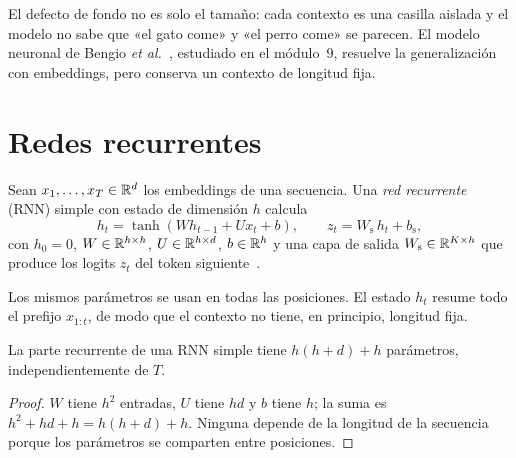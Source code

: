 El defecto de fondo no es solo el tamaño: cada contexto es una casilla aislada y el modelo no sabe que «el gato come» y «el perro come» se parecen. El modelo neuronal de Bengio \emph{et al.}~\cite{bengio03}, estudiado en el módulo~9, resuelve la generalización con embeddings, pero conserva un contexto de longitud fija.

\section{Redes recurrentes}

\begin{definicion}\label{def:rnn}
Sean $x_1,\dots,x_T\in\mathbb{R}^{d}$ los embeddings de una secuencia. Una \emph{red recurrente} (RNN) simple con estado de dimensión $h$ calcula
\[
h_t=\tanh(W h_{t-1}+U x_t+b),\qquad z_t=W_{\mathrm{s}}\,h_t+b_{\mathrm{s}},
\]
con $h_0=0$, $W\in\mathbb{R}^{h\times h}$, $U\in\mathbb{R}^{h\times d}$, $b\in\mathbb{R}^{h}$ y una capa de salida $W_{\mathrm{s}}\in\mathbb{R}^{K\times h}$ que produce los logits $z_t$ del token siguiente~\cite[§14.1--14.2]{jm3}.
\end{definicion}

Los mismos parámetros se usan en todas las posiciones. El estado $h_t$ resume todo el prefijo $x_{1:t}$, de modo que el contexto no tiene, en principio, longitud fija.

\begin{proposicion}\label{prop:param-rnn}
La parte recurrente de una RNN simple tiene $h(h+d)+h$ parámetros, independientemente de $T$.
\end{proposicion}

\begin{proof}
$W$ tiene $h^{2}$ entradas, $U$ tiene $hd$ y $b$ tiene $h$; la suma es $h^{2}+hd+h=h(h+d)+h$. Ninguna depende de la longitud de la secuencia porque los parámetros se comparten entre posiciones.
\end{proof}

